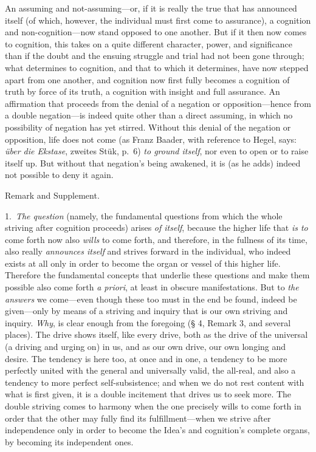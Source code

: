 \documentclass[12pt,a4paper]{book}
\begin{document}
An assuming and not-assuming---or, if it is really the true that has announced itself
(of which, however, the individual must first come to assurance), a cognition and
non-cognition---now stand opposed to one another. But if it then now comes to cognition, this
takes on a quite different character, power, and significance than if the doubt and the ensuing
struggle and trial had not been gone through; what determines to cognition, and that to which it
determines, have now stepped apart from one another, and cognition now first fully becomes a
cognition of truth by force of its truth, a cognition with insight and full assurance. An
affirmation that proceeds from the denial of a negation or opposition---hence from a double
negation---is indeed quite other than a direct assuming, in which no possibility of negation has
yet stirred. Without this denial of the negation or opposition, life does not come (as Franz
Baader, with reference to Hegel, says: \textit{über die Ekstase}, zweites Stük, p.~6)
\emph{to ground itself}, nor even to open or to raise itself up. But without that negation's
being awakened, it is (as he adds) indeed not possible to deny it again.

\begin{center}Remark and Supplement.\end{center}
1.~\emph{The question} (namely, the fundamental questions from which the whole striving after
cognition proceeds) arises \emph{of itself}, because the higher life that \emph{is to} come forth now
also \emph{wills} to come forth, and therefore, in the fullness of its time, also really \emph{announces
itself} and strives forward in the individual, who indeed exists at all only in order to become
the organ or vessel of this higher life. Therefore the fundamental concepts that underlie these
questions and make them possible also come forth \emph{a priori}, at least in obscure
manifestations. But to \emph{the answers} we come---even though these too must in the end be
found, indeed be given---only by means of a striving and inquiry that is our own striving and
inquiry. \emph{Why}, is clear enough from the foregoing (§ 4, Remark 3, and several places). The drive
shows itself, like every drive, both as the drive of the universal (a driving and urging
on) in us, and as our own drive, our own longing and desire. The tendency is here too, at once
and in one, a tendency to be more perfectly united with the general and universally valid, the
all-real, and also a tendency to more perfect self-subsistence; and when we do not rest content
with what is first given, it is a double incitement that drives us to seek more. The double
striving comes to harmony when the one precisely wills to come forth in order that the other may
fully find its fulfillment---when we strive after independence only in order to become the
Idea's and cognition's complete organs, by becoming its independent ones.
\end{document}
